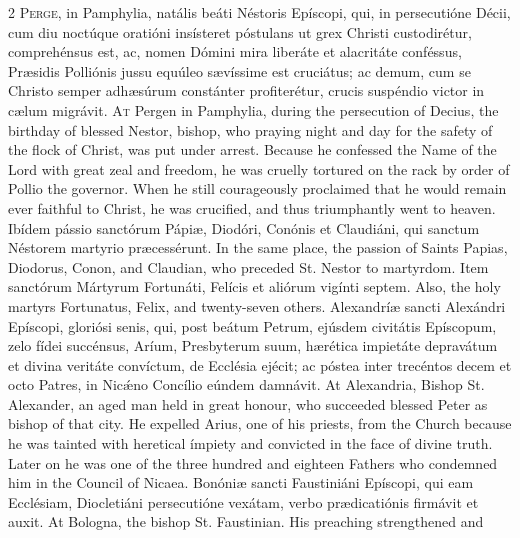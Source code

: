 \begin{paracol}{2}
\lettrine[lines=2]{P}{erge,} in Pamphylia, natális beáti Néstoris 
 Epíscopi, qui, in persecutióne Décii, cum diu noctúque oratióni insísteret 
 póstulans ut grex Christi custodirétur, comprehénsus est, ac, nomen Dómini 
 mira liberáte et alacritáte conféssus, Præsidis Polliónis jussu equúleo 
 sævíssime est cruciátus; ac demum, cum se Christo semper adhæsúrum 
 constánter profiterétur, crucis suspéndio victor in cælum migrávit.
\switchcolumn
{}
\lettrine[lines=2]{A}{t} Pergen in Pamphylia, during the persecution of Decius, the birthday of 
 blessed Nestor, bishop, who praying night and day for the safety of the 
 flock of Christ, was put under arrest. Because he confessed the Name 
 of the Lord with great zeal and freedom, he was cruelly tortured on the rack 
 by order of Pollio the governor. When he still courageously proclaimed 
 that he would remain ever faithful to Christ, he was crucified, and thus 
 triumphantly went to heaven.
\switchcolumn*
{}
Ibídem pássio sanctórum Pápiæ, Diodóri, Conónis 
 et Claudiáni, qui sanctum Néstorem martyrio præcessérunt.
\switchcolumn
{}
In the same place, the passion of Saints Papias, Diodorus, Conon, and 
 Claudian, who preceded St. Nestor to martyrdom.
\switchcolumn*
{}
Item sanctórum Mártyrum Fortunáti, Felícis et aliórum vigínti septem.
\switchcolumn
{}
Also, the holy martyrs Fortunatus, Felix, and twenty-seven others.
\switchcolumn*
{}
Alexandríæ sancti Alexándri Epíscopi, gloriósi 
 senis, qui, post beátum Petrum, ejúsdem civitátis Epíscopum, zelo fídei 
 succénsus, Aríum, Presbyterum suum, hærética impietáte depravátum et divina 
 veritáte convíctum, de Ecclésia ejécit; ac póstea inter trecéntos decem et 
 octo Patres, in Nicǽno Concílio eúndem damnávit.
\switchcolumn
{}
At Alexandria, Bishop St. Alexander, an aged man held in great honour, who 
 succeeded blessed Peter as bishop of that city. He expelled Arius, one 
 of his priests, from the Church because he was tainted with heretical 
 ímpiety and convicted in the face of divine truth. Later on he was one 
 of the three hundred and eighteen Fathers who condemned him in the Council 
 of Nicaea.
\switchcolumn*
{}
Bonóniæ sancti Faustiniáni Epíscopi, qui eam 
 Ecclésiam, Diocletiáni persecutióne vexátam, verbo prædicatiónis firmávit et 
 auxit.
\switchcolumn
{}
At Bologna, the bishop St. Faustinian. His preaching strengthened and 

\end{paracol}
